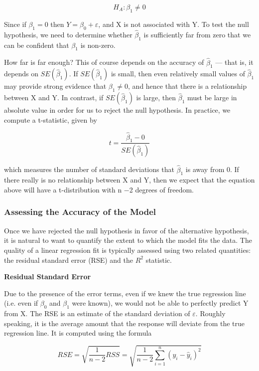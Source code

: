 \documentclass{article}
\theoremstyle{definition}
\theoremstyle{remark}
\begin{document}
	\[
	H_A:\beta_1\ne 0
	\]
	
	Since if $\beta_1=0$ then $Y=\beta_0+\varepsilon$, and X is not associated with Y. To test the null hypothesis, we need to determine whether $\hat{\beta}_1$ is sufficiently far from zero that we can be confident that $\beta_1$ is non-zero. 
	
	How far is far enough? This of course depends on the accuracy of $\hat{\beta}_1$ — that is, it depends on $SE(\hat{\beta}_1)$. If $SE(\hat{\beta}_1)$ is small, then even relatively small values of $\hat{\beta}_1$ may provide strong evidence that $\beta_1\ne 0$, and hence that there is a relationship between X and Y. In contrast, if $SE(\hat{\beta}_1)$ is large, then $\hat{\beta}_1$ must be large in absolute value in order for us to reject the null hypothesis. In practice, we compute a t-statistic, given by
	
	\[
	t=\frac{\hat{\beta}_1-0}{SE(\hat{\beta}_1)}
	\]
	
	which measures the number of standard deviations that $\hat{\beta}_1$ is away from 0. If there really is no relationship between X and Y, then we expect that the equation above will have a t-distribution with n −2 degrees of freedom.
	
	\subsubsection*{Assessing the Accuracy of the Model}
	
	Once we have rejected the null hypothesis in favor of the alternative hypothesis, it is natural to want to quantify the extent to which the model fits the data. The quality of a linear regression fit is typically assessed using two related quantities: the residual standard error (RSE) and the $R^2$ statistic.
	
	\hspace{\fill}
	
\noindent	\textbf{Residual Standard Error}
	
	Due to the presence of the error terms, even if we knew the true regression line (i.e. even if $\beta_0$ and $\beta_1$ were known), we would not be able to perfectly predict Y from X. The RSE is an estimate of the standard deviation of $\varepsilon$. Roughly speaking, it is the average amount that the response will deviate from the true regression line. It is computed using the formula
	
	\[
	RSE=\sqrt{\frac{1}{n-2}RSS}=\sqrt{\frac{1}{n-2}\sum^n_{i=1}(y_i-\hat{y}_i)^2}
	\]
	
\end{document}
